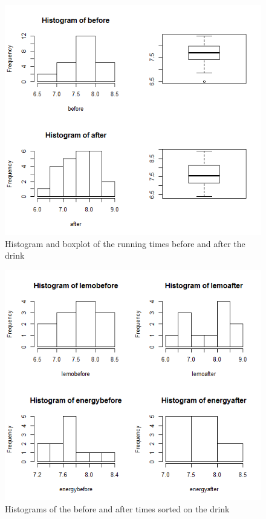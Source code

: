 \documentclass{article}
\begin{document}
    \begin{figure}
      \includegraphics[scale=0.6]{../results/GraphBeforeAfter.png}
      \caption{Histogram and boxplot of the running times before and after the drink}
      \label{fig:RunBefAf}
    \end{figure}
    \begin{figure}
      \includegraphics[scale=0.6]{../results/HistLemoEnergy.png}
      \caption{Histograms of the before and after times sorted on the drink}
      \label{fig:RunDrink}
    \end{figure}
\end{document}
